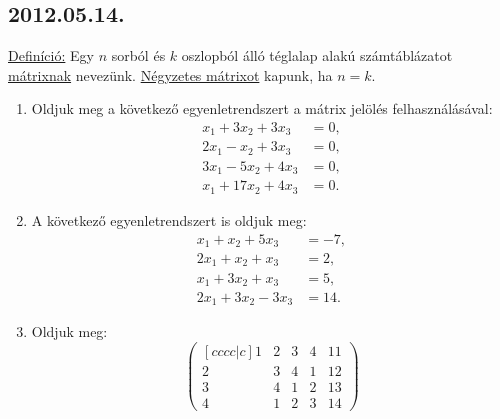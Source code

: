 \documentclass{article}
\begin{document}
\subsection*{2012.05.14.}
\underline{Definíció:} Egy $n$ sorból és $k$ oszlopból álló téglalap alakú számtáblázatot \underline{mátrixnak} nevezünk. \underline{Négyzetes mátrixot} kapunk, ha $n=k$.
\begin{enumerate}
\item Oldjuk meg a következő egyenletrendszert a mátrix jelölés felhasználásával:
\begin{align*}
x_1+3x_2+3x_3&=0,\\
2x_1-x_2+3x_3&=0,\\
3x_1-5x_2+4x_3&=0,\\
x_1+17x_2+4x_3&=0.
\end{align*}
\item A következő egyenletrendszert is oldjuk meg:
\begin{align*}
x_1+x_2+5x_3&=-7,\\
2x_1+x_2+x_3&=2,\\
x_1+3x_2+x_3&=5,\\
2x_1+3x_2-3x_3&=14.
\end{align*}

\item Oldjuk meg:
 $$\begin{pmatrix}[cccc|c]
 1&2&3&4&11\\
 2&3&4&1&12\\
 3&4&1&2&13\\
 4&1&2&3&14
 \end{pmatrix}$$
\end{enumerate}
\end{document}
